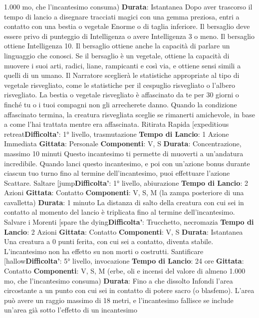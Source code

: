 \begin{multicols}{2}
1.000 mo, che l’incantesimo consuma)
\textbf{Durata}: Istantanea
Dopo aver trascorso il tempo di lancio a disegnare
tracciati magici con una gemma preziosa, entri a
contatto con una bestia o vegetale Enorme o di taglia
inferiore. Il bersaglio deve essere privo di punteggio di
Intelligenza o avere Intelligenza 3 o meno. Il bersaglio
ottiene Intelligenza 10. Il bersaglio ottiene anche la
capacità di parlare un linguaggio che conosci. Se il
bersaglio è un vegetale, ottiene la capacità di muovere i
suoi arti, radici, liane, rampicanti e così via, e ottiene
sensi simili a quelli di un umano. Il Narratore sceglierà le
statistiche appropriate al tipo di vegetale risvegliato,
come le statistiche per il cespuglio risvegliato o l’albero
risvegliato.
La bestia o vegetale risvegliato è affascinato da te per
30 giorni o finché tu o i tuoi compagni non gli
arrecherete danno. Quando la condizione affascinato
termina, la creatura risvegliata sceglie se rimanerti
amichevole, in base a come l’hai trattata mentre era
affascinata.
Ritirata Rapida
[expeditious retreat\textbf{Difficolta'}:
1° livello, trasmutazione
\textbf{Tempo di Lancio}: 1 Azione Immediata
\textbf{Gittata}: Personale
\textbf{Componenti}: V, S
\textbf{Durata}: Concentrazione, massimo 10 minuti
Questo incantesimo ti permette di muoverti a
un’andatura incredibile. Quando lanci questo
incantesimo, e poi con un’azione bonus durante
ciascun tuo turno fino al termine dell’incantesimo, puoi
effettuare l’azione Scattare.
Saltare
[jump\textbf{Difficolta'}:
1° livello, abiurazione
\textbf{Tempo di Lancio}: 2 Azioni
\textbf{Gittata}: Contatto
\textbf{Componenti}: V, S, M (la zampa posteriore di una
cavalletta)
\textbf{Durata}: 1 minuto
La distanza di salto della creatura con cui sei in contatto
al momento del lancio è triplicata fino al termine
dell’incantesimo.
Salvare i Morenti
[spare the dying\textbf{Difficolta'}:
Trucchetto, necromazia
\textbf{Tempo di Lancio}: 2 Azioni
\textbf{Gittata}: Contatto
\textbf{Componenti}: V, S
\textbf{Durata}: Istantanea
Una creatura a 0 punti ferita, con cui sei a contatto,
diventa stabile. L’incantesimo non ha effetto su non
morti o costrutti.
Santificare
[hallow\textbf{Difficolta'}:
5° livello, invocazione
\textbf{Tempo di Lancio}: 24 ore
\textbf{Gittata}: Contatto
\textbf{Componenti}: V, S, M (erbe, oli e incensi del valore di
almeno 1.000 mo, che l’incantesimo consuma)
\textbf{Durata}: Fino a che dissolto
Infondi l’area circostante a un punto con cui sei in
contatto di potere sacro (o blasfemo). L’area può avere
un raggio massimo di 18 metri, e l’incantesimo fallisce
se include un’area già sotto l’effetto di un incantesimo

\end{multicols}
